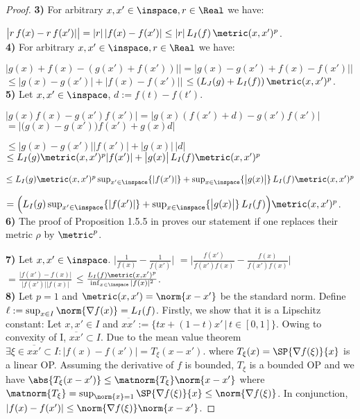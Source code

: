 \begin{lem}
\begin{proof}
\textbf{3)}  For arbitrary $x,x' \in \inspace , r \in \Real$ we have:

$\bigl| r \, f(x) - r \, f(x')| \bigr| = |r|\, |f(x) - f(x')| \leq |r| \,L_I(f)\,  \metric(x,x')^{p}$.\\ 

\textbf{4)}  For arbitrary $x,x' \in \inspace , r \in \Real$ we have:

$\bigl| g(x) + f(x) - (g(x') + f(x'))| \bigr| = \bigl| g(x)  - g(x') + f(x)- f(x')| \bigr|$ 
$\leq \bigl| g(x)  - g(x')\bigr|  + \bigl| f(x)- f(x')| \bigr|$ $\leq (L_J(g)+L_I(f))\,  \metric(x,x')^{p}$.\\

\textbf{5)}  Let  $x,x' \in \inspace $, $d := f(t) - f(t')$.

$\bigl| g(x) f(x) - g(x')  f(x') \bigr| = \bigl| g(x) (f(x') +d) - g(x') f(x') \bigr|$ 
$= \bigl|\bigl( g(x) - g(x') \bigl)  f(x')+ g(x)  d \bigr|  $

$\leq \bigl| g(x) - g(x') \bigr|  |f(x')|   + \bigl|g(x)\bigr| \,  |d|  $
$\leq L_I(g) \metric(x,x')^p  |f(x')|   + \bigl|g(x)\bigr| \,  L_I(f) \metric(x,x')^p  $

$\leq L_I(g) \metric(x,x')^p  \sup_{x' \in \inspace } \{|f(x')|\}   + \sup_{x \in \inspace }\{\bigl|g(x)\bigr|\} \,  L_I(f) \metric(x,x')^p  $

$= \Bigl(L_I(g)  \sup_{x' \in \inspace } \{|f(x')|\}   + \sup_{x \in \inspace }\{\bigl|g(x)\bigr|\} \,  L_I(f)\Bigl) \metric(x,x')^p  $.\\

\textbf{6)}  The proof of Proposition 1.5.5 in \cite{Weaver1999} proves our statement if one replaces their 
metric $\rho$ by $\metric^p$.

\textbf{7)}  Let  $x,x' \in \inspace $.
$\bigl| \frac{1}{f(x)} - \frac{1}{f(x')} \bigr|$ 
$=\bigl| \frac{f(x')}{f(x') f(x)} -\frac{f(x)}{f(x') f(x)} \bigr|$ 
$= \frac{\bigl|f(x')-f(x) \bigr|}{\bigl|f(x')\bigr| \bigr| f(x)\bigr|}$ 
$\leq \frac{L_I(f) \metric(x,x')^p}{\inf_{x \in \inspace } |f(x)|^2}$.\\

\textbf{8)} Let $p=1$ and $\metric(x,x') = \norm{x-x'}$ be the standard norm. Define $\ell := \sup_{x \in I } \norm{ \nabla f(x) } = L_I(f)$. 
Firstly, we show that it is a Lipschitz constant: Let $x,x' \in I $ and 
$\overline{xx'} := \{tx + (1-t) x' \, | \, t \in [0,1]\}$. 
Owing to convexity of I, $\overline{xx'} \subset I$. Due to the mean value theorem $\exists \xi \in \overline{xx'} \subset I: |f(x) - f(x')|=  T_\xi (x-x')$. where $T_\xi (x) = \SP{\nabla f(\xi)}{ x}$ is a linear OP. Assuming the derivative of $f$ is bounded, $T_\xi$ is a bounded OP and we have $\abs{T_\xi (x-x') } \leq \matnorm{T_\xi} \norm{x-x'}$ where 
$\matnorm{T_\xi} = \sup_{\norm{x} = 1} \SP{\nabla f(\xi)}{x} \leq \norm{\nabla f(\xi)}$. In conjunction,
$|f(x) - f(x')| \leq \norm{\nabla f(\xi)} \norm{x-x'}$. 


\end{proof}
\end{lem}

